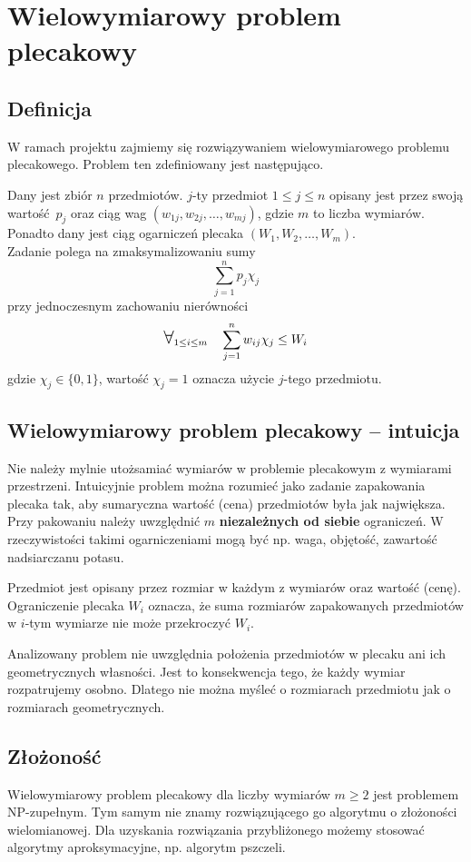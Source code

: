 \documentclass[a4paper,12pt,notitlepage]{mwrep}
\begin{document}
\section{Wielowymiarowy problem plecakowy}
\subsection{Definicja}
W ramach projektu zajmiemy się rozwiązywaniem wielowymiarowego problemu plecakowego.
Problem ten zdefiniowany jest następująco.

Dany jest zbiór $n$ przedmiotów. $j$-ty przedmiot $1 \le j \le n$
opisany jest przez swoją wartość~$p_j$ oraz ciąg wag
$(w_{1j}, w_{2j}, \dots, w_{mj})$, gdzie $m$ to liczba wymiarów.\\
Ponadto dany jest ciąg ogarniczeń plecaka $(W_1, W_2, \dots, W_m)$.\\
Zadanie polega na zmaksymalizowaniu sumy
$$ \sum_{j=1}^n p_j\chi_j$$
przy jednoczesnym zachowaniu nierówności
$$\bigforall_{1 \le i \le m}\quad\sum_{j=1}^n w_{ij}\chi_j \le W_i$$
gdzie $\chi_j \in \{0, 1\}$, wartość $\chi_j=1$
oznacza użycie $j$-tego przedmiotu.

\subsection{Wielowymiarowy problem plecakowy -- intuicja}
Nie należy mylnie utożsamiać wymiarów w problemie plecakowym z 
wymiarami przestrzeni. Intuicyjnie problem można rozumieć jako zadanie
zapakowania plecaka tak, aby sumaryczna wartość (cena)
przedmiotów była jak największa.
Przy pakowaniu należy uwzględnić $m$ \textbf{niezależnych od siebie}
ograniczeń. W rzeczywistości takimi ogarniczeniami mogą być np. waga,
objętość, zawartość nadsiarczanu potasu.

Przedmiot jest opisany przez
rozmiar w każdym z wymiarów oraz wartość (cenę). Ograniczenie plecaka
$W_i$ oznacza, że suma rozmiarów zapakowanych przedmiotów w $i$-tym
wymiarze nie może przekroczyć $W_i$.

Analizowany problem nie uwzględnia położenia przedmiotów w plecaku
ani ich geometrycznych własności. Jest to konsekwencja tego, że każdy
wymiar rozpatrujemy osobno. Dlatego nie można myśleć o rozmiarach
przedmiotu jak o rozmiarach geometrycznych.

\subsection{Złożoność}
Wielowymiarowy problem plecakowy dla liczby wymiarów $m \ge 2$ jest
problemem NP-zupełnym. Tym samym nie znamy rozwiązującego go
algorytmu o złożoności wielomianowej. Dla uzyskania rozwiązania
przybliżonego możemy stosować algorytmy aproksymacyjne, np. algorytm
pszczeli.
\end{document}
